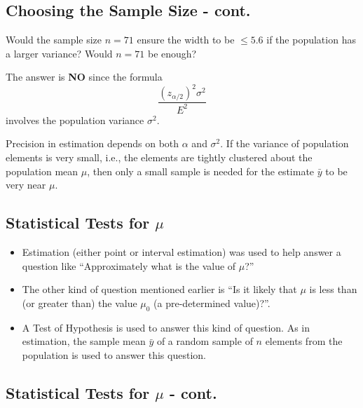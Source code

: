 \documentclass[
  letterpaper,
  DIV=11,
  numbers=noendperiod]{scrartcl}
\begin{document}
\subsection{Choosing the Sample Size -
cont.}\label{choosing-the-sample-size---cont.-1}

Would the sample size \(n = 71\) ensure the width to be \(\leq 5.6\) if
the population has a larger variance? Would \(n = 71\) be enough?

The answer is \textbf{NO} since the formula
\[\frac{(z_{\alpha/2})^2\sigma^2}{E^2}\] involves the population
variance \(\sigma^2\).

Precision in estimation depends on both \(\alpha\) and \(\sigma^2\). If
the variance of population elements is very small, i.e., the elements
are tightly clustered about the population mean \(\mu\), then only a
small sample is needed for the estimate \(\bar{y}\) to be very near
\(\mu\).

\subsection{\texorpdfstring{Statistical Tests for
\(\mu\)}{Statistical Tests for \textbackslash mu}}\label{statistical-tests-for-mu}

\begin{itemize}
\item
  Estimation (either point or interval estimation) was used to help
  answer a question like ``Approximately what is the value of \(\mu\)?''
\item
  The other kind of question mentioned earlier is ``Is it likely that
  \(\mu\) is less than (or greater than) the value \(\mu_0\) (a
  pre-determined value)?''.
\item
  A {Test of Hypothesis} is used to answer this kind of question. As in
  estimation, the sample mean \(\bar{y}\) of a random sample of \(n\)
  elements from the population is used to answer this question.
\end{itemize}

\subsection{\texorpdfstring{Statistical Tests for \(\mu\) -
cont.}{Statistical Tests for \textbackslash mu - cont.}}\label{statistical-tests-for-mu---cont.}
\end{document}
